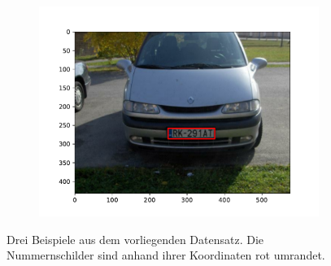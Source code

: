 \begin{figure}
\begin{subfigure}{0.32\textwidth}
        \includegraphics[width=\textwidth]{abbildungen/car_3}
    \end{subfigure}
    \caption[Beispielbilder]{Drei Beispiele aus dem vorliegenden Datensatz.
        Die Nummernschilder sind anhand ihrer Koordinaten rot umrandet.}
    \label{fig:autos}
\end{figure}